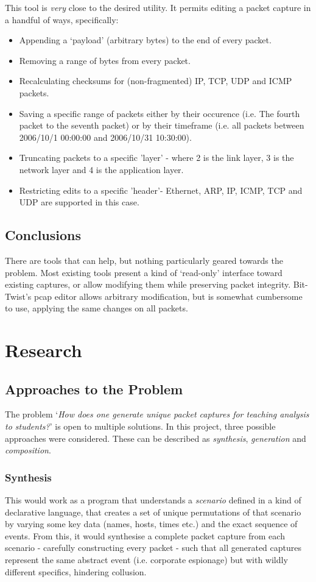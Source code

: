 \documentclass[10pt,a4paper,notitlepage]{report}
\begin{document}
This tool is \emph{very} close to the desired utility. It permits editing a packet capture in a handful of ways, specifically:
\begin{itemize}
\item Appending a `payload' (arbitrary bytes) to the end of every packet.
\item Removing a range of bytes from every packet.
\item Recalculating checksums for (non-fragmented) IP, TCP, UDP and ICMP packets.
\item Saving a specific range of packets either by their occurence (i.e. The fourth packet to the seventh packet) or by their timeframe (i.e. all packets between 2006/10/1 00:00:00 and 2006/10/31 10:30:00).
\item Truncating packets to a specific 'layer' - where 2 is the link layer, 3 is the network layer and 4 is the application layer.
\item Restricting edits to a specific 'header'- Ethernet, ARP, IP, ICMP, TCP and UDP are supported in this case.
\end{itemize}

\section{Conclusions}
There are tools that can help, but nothing particularly geared towards the problem. Most existing tools present a kind of `read-only' interface toward existing captures, or allow modifying them while preserving packet integrity. Bit-Twist's pcap editor allows arbitrary modification, but is somewhat cumbersome to use, applying the same changes on all packets.

\chapter{Research}
\section{Approaches to the Problem}
The problem `\emph{How does one generate unique packet captures for teaching analysis to students?}' is open to multiple solutions. In this project, three possible approaches were considered. These can be described as \emph{synthesis}, \emph{generation} and \emph{composition}.

\subsection{Synthesis}
This would work as a program that understands a \emph{scenario} defined in a kind of declarative language, that creates a set of unique permutations of that scenario by varying some key data (names, hosts, times etc.) and the exact sequence of events. From this, it would synthesise a complete packet capture from each scenario - carefully constructing every packet - such that all generated captures represent the same abstract event (i.e. corporate espionage) but with wildly different specifics, hindering collusion.
\end{document}
